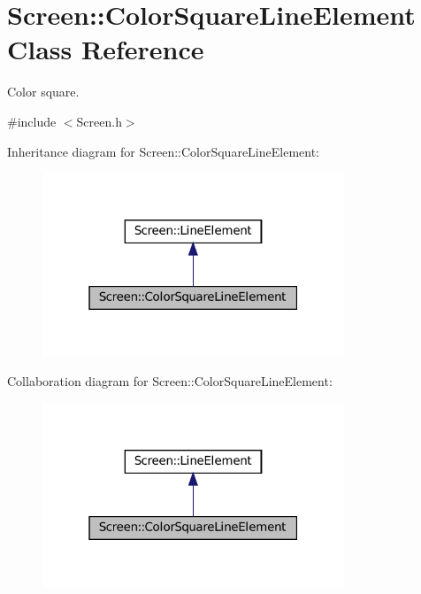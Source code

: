 \hypertarget{classScreen_1_1ColorSquareLineElement}{}\section{Screen\+:\+:Color\+Square\+Line\+Element Class Reference}
\label{classScreen_1_1ColorSquareLineElement}


Color square.  




{\ttfamily \#include $<$Screen.\+h$>$}



Inheritance diagram for Screen\+:\+:Color\+Square\+Line\+Element\+:\nopagebreak
\begin{figure}[H]
\begin{center}
\leavevmode
\includegraphics[width=256pt]{classScreen_1_1ColorSquareLineElement__inherit__graph}
\end{center}
\end{figure}


Collaboration diagram for Screen\+:\+:Color\+Square\+Line\+Element\+:\nopagebreak
\begin{figure}[H]
\begin{center}
\leavevmode
\includegraphics[width=256pt]{classScreen_1_1ColorSquareLineElement__coll__graph}
\end{center}
\end{figure}
